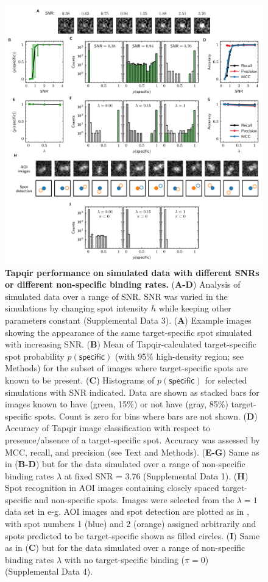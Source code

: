 \begin{figure}
\begin{fullwidth}
\includegraphics[width=183mm]{figures/tapqir_performance.png}
\caption{\textbf{Tapqir performance on simulated data with different SNRs or different non-specific binding rates.} (\textbf{A-D}) Analysis of simulated data over a range of SNR. SNR was varied in the simulations by changing spot intensity  $h$ while keeping other parameters constant (Supplemental Data 3). (\textbf{A}) Example images showing the appearance of the same target-specific spot simulated with increasing SNR.   (\textbf{B}) Mean of Tapqir-calculated target-specific spot probability $p(\mathsf{specific})$ (with 95\% high-density region; see Methods) for the subset of images where target-specific spots  are known to be present. (\textbf{C}) Histograms of $p(\mathsf{specific})$ for selected simulations with SNR indicated. Data are shown as stacked bars for images known to have (green, 15\%) or not have (gray, 85\%) target-specific spots.  Count is zero for bins where bars are not shown. (\textbf{D}) Accuracy of Tapqir image classification with respect to presence/absence of a target-specific spot. Accuracy was assessed by MCC, recall, and precision (see Text and Methods). (\textbf{E-G}) Same as in (\textbf{B-D}) but for the data simulated over a range of non-specific binding rates $\lambda$ at fixed SNR = 3.76 (Supplemental Data 1). (\textbf{H}) Spot recognition in AOI images containing closely spaced target-specific and non-specific spots.  Images were selected from the $\lambda = 1$ data set in e-g. AOI images and spot detection are plotted as in , with spot numbers 1 (blue) and 2 (orange) assigned arbitrarily and spots predicted to be target-specific shown as filled circles. (\textbf{I}) Same as in (\textbf{C}) but for the data simulated over a range of non-specific binding rates $\lambda$ with no target-specific binding ($\pi = 0$) (Supplemental Data 4).}

\end{fullwidth}
\end{figure}
